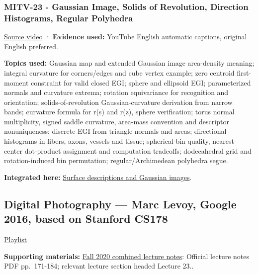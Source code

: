 \subsubsection{MITV-23 - Gaussian Image, Solids of Revolution, Direction Histograms, Regular Polyhedra}\label{04-visual-computing-ii-ch036-mitv-23---gaussian-image-solids-of-revolution-direction-histograms-regular-polyhedra}

\hypertarget{04-visual-computing-ii-ch036-mitv-23---gaussian-image-solids-of-revolution-direction-histograms-regular-polyhedra}{}

\href{https://www.youtube.com/watch?v=s9wu_z8EKAc}{Source video} · \textbf{Evidence used:} YouTube English automatic captions, original English preferred.

\textbf{Topics used:} Gaussian map and extended Gaussian image area-density meaning; integral curvature for corners/edges and cube vertex example; zero centroid first-moment constraint for valid closed EGI; sphere and ellipsoid EGI; parameterized normals and curvature extrema; rotation equivariance for recognition and orientation; solids-of-revolution Gaussian-curvature derivation from narrow bands; curvature formula for r(s) and r(z), sphere verification; torus normal multiplicity, signed saddle curvature, area-mass convention and descriptor nonuniqueness; discrete EGI from triangle normals and areas; directional histograms in fibers, axons, vessels and tissue; spherical-bin quality, nearest-center dot-product assignment and computation tradeoffs; dodecahedral grid and rotation-induced bin permutation; regular/Archimedean polyhedra segue.

\textbf{Integrated here:} \hyperref[04-visual-computing-ii-ch032-surface-descriptions-and-gaussian-images]{Surface descriptions and Gaussian images}.

\subsection{Digital Photography --- Marc Levoy, Google 2016, based on Stanford CS178}\label{04-visual-computing-ii-ch036-digital-photography-marc-levoy-google-2016-based-on-stanford-cs178}

\hypertarget{04-visual-computing-ii-ch036-digital-photography-marc-levoy-google-2016-based-on-stanford-cs178}{}

\href{https://www.youtube.com/playlist?list=PL7ddpXYvFXspUN0N-gObF1GXoCA-DA-7i}{Playlist}

\textbf{Supporting materials:} \href{https://ocw.mit.edu/courses/6-801-machine-vision-fall-2020/9ec44f69e72995c370b3797818ba01e6_MIT6_801F20_lectureNotes.pdf}{Fall 2020 combined lecture notes}: Official lecture notes PDF pp.~171-184; relevant lecture section headed Lecture 23..

